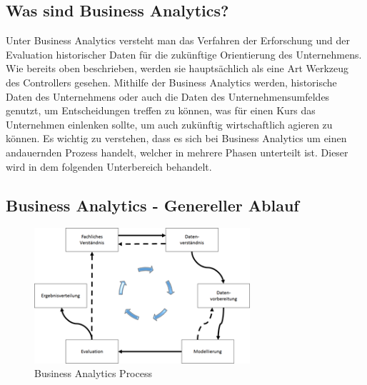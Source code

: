 \documentclass[12pt,twocolumn,twoside]{conference}   %
\begin{document}
\subsection{Was sind Business Analytics?}
Unter Business Analytics versteht man das Verfahren der Erforschung und der Evaluation  historischer Daten für die zukünftige Orientierung des Unternehmens.  Wie bereits oben beschrieben, werden sie hauptsächlich als eine Art Werkzeug des Controllers gesehen. Mithilfe der Business Analytics werden, historische Daten des Unternehmens oder auch die Daten des Unternehmensumfeldes genutzt, um Entscheidungen treffen zu können, was für einen Kurs das Unternehmen einlenken sollte, um auch zukünftig wirtschaftlich agieren zu können. Es wichtig zu verstehen, dass es sich bei Business Analytics um einen andauernden Prozess handelt, welcher in mehrere Phasen unterteilt ist. Dieser wird in dem folgenden Unterbereich behandelt.

\newpage
\subsection{Business Analytics - Genereller Ablauf}

\begin{figure}[H]
\centering
\includegraphics[width=8cm]{Abbildungen/Business_Analytics_Process.png}
\caption{Business Analytics Process}\label{visina8}
\end{figure}
\end{document}
